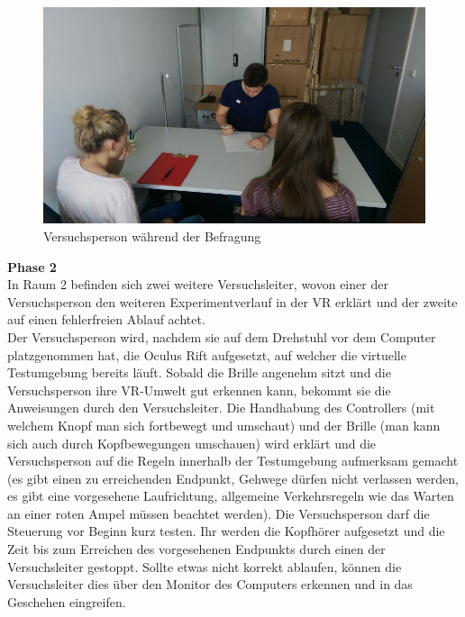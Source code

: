 \documentclass{Bericht}
\begin{document}
\begin{figure}[H]
	\centering    
	\includegraphics[height=\textheight, width=\linewidth, keepaspectratio]{../Bilder/t.jpg}
	\caption{Versuchsperson während der Befragung}
	\label{img:befragung}
\end{figure}

\textbf{Phase 2}\\ 
In Raum 2 befinden sich zwei weitere Versuchsleiter, wovon einer der Versuchsperson den weiteren Experimentverlauf in der VR erklärt und der zweite auf einen fehlerfreien Ablauf achtet.\\
Der Versuchsperson wird, nachdem sie auf dem Drehstuhl vor dem Computer platzgenommen hat, die Oculus Rift aufgesetzt, auf welcher die virtuelle Testumgebung bereits läuft. Sobald die Brille angenehm sitzt und die Versuchsperson ihre VR-Umwelt gut erkennen kann, bekommt sie die Anweisungen durch den Versuchsleiter. 
Die Handhabung des Controllers (mit welchem Knopf man sich fortbewegt und umschaut) und der Brille (man kann sich auch durch Kopfbewegungen umschauen) wird erklärt und die Versuchsperson auf die Regeln innerhalb der Testumgebung aufmerksam gemacht (es gibt einen zu erreichenden Endpunkt, Gehwege dürfen nicht verlassen werden, es gibt eine vorgesehene Laufrichtung, allgemeine Verkehrsregeln wie das Warten an einer roten Ampel müssen beachtet werden).  
Die Versuchsperson darf die Steuerung vor Beginn kurz testen. Ihr werden die Kopfhörer aufgesetzt und die Zeit bis zum Erreichen des vorgesehenen Endpunkts durch einen der Versuchsleiter gestoppt.
Sollte etwas nicht korrekt ablaufen, können die Versuchsleiter dies über den Monitor des Computers erkennen und in das Geschehen eingreifen.
\end{document}
